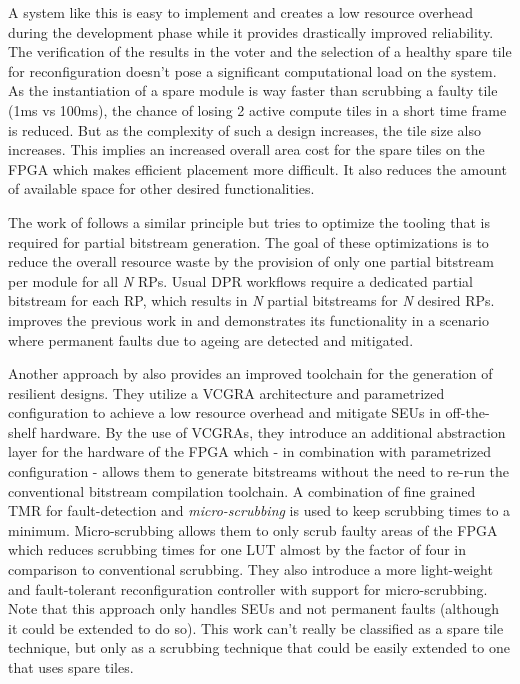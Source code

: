 A system like this is easy to implement and creates a low resource overhead during the development phase while it provides drastically improved reliability.
The verification of the results in the voter and the selection of a healthy spare tile for reconfiguration doesn't pose a significant computational load on the system.
As the instantiation of a spare module is way faster than scrubbing a faulty tile (1ms vs 100ms), the chance of losing 2 active compute tiles in a short time frame is reduced. 
But as the complexity of such a design increases, the tile size also increases. 
This implies an increased overall area cost for the spare tiles on the \gls{FPGA} which makes efficient placement more difficult.
It also reduces the amount of available space for other desired functionalities. 


The work of \cite{martins_tmr_2015} follows a similar principle but tries to optimize the tooling that is required for partial bitstream generation.
The goal of these optimizations is to reduce the overall resource waste by the provision of only one partial bitstream per module for all \textit{N} \glspl{RP}. %
Usual \gls{DPR} workflows require a dedicated partial bitstream for each \gls{RP}, which results in \textit{N} partial bitstreams for \textit{N} desired \glspl{RP}.
\cite{martins_dynamic_2018} improves the previous work in \cite{martins_tmr_2015} and demonstrates its functionality in a scenario where permanent faults due to ageing are detected and mitigated.

Another approach by \cite{kourfali2019} also provides an improved toolchain for the generation of resilient designs. 
They utilize a \gls{VCGRA} architecture and parametrized configuration \cite{heyse2013} to achieve a low resource overhead and mitigate \glspl{SEU} in off-the-shelf hardware.
By the use of \glspl{VCGRA}, they introduce an additional abstraction layer for the hardware of the \gls{FPGA} which - in combination with parametrized configuration - allows them to generate bitstreams without the need to re-run the conventional bitstream compilation toolchain.
A combination of fine grained \gls{TMR} for fault-detection and \textit{micro-scrubbing} is used to keep scrubbing times to a minimum. 
Micro-scrubbing allows them to only scrub faulty areas of the \gls{FPGA} which reduces scrubbing times for one \gls{LUT} almost by the factor of four in comparison to conventional scrubbing.
They also introduce a more light-weight and fault-tolerant reconfiguration controller with support for micro-scrubbing. 
Note that this approach only handles \glspl{SEU} and not permanent faults (although it could be extended to do so).
This work can't really be classified as a spare tile technique, but only as a scrubbing technique that could be easily extended to one that uses spare tiles. 

